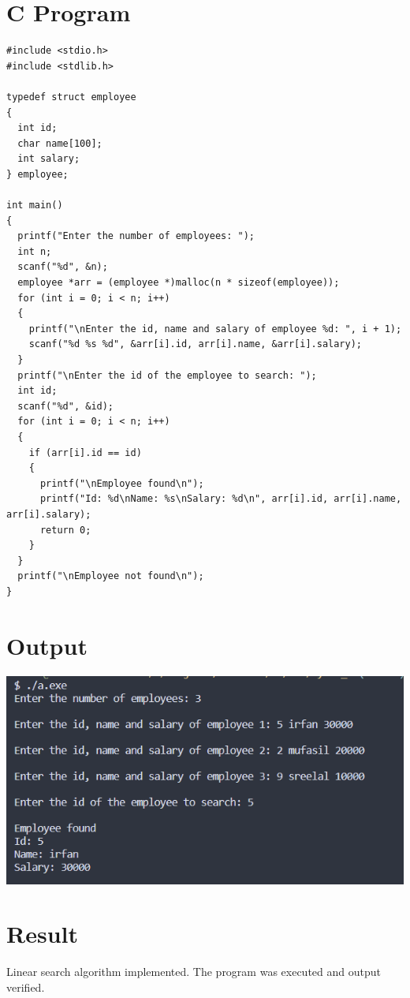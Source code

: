 \section{C Program}
\begin{lstlisting}[label={list:c_program:employee_search}]
#include <stdio.h>
#include <stdlib.h>

typedef struct employee
{
  int id;
  char name[100];
  int salary;
} employee;

int main()
{
  printf("Enter the number of employees: ");
  int n;
  scanf("%d", &n);
  employee *arr = (employee *)malloc(n * sizeof(employee));
  for (int i = 0; i < n; i++)
  {
    printf("\nEnter the id, name and salary of employee %d: ", i + 1);
    scanf("%d %s %d", &arr[i].id, arr[i].name, &arr[i].salary);
  }
  printf("\nEnter the id of the employee to search: ");
  int id;
  scanf("%d", &id);
  for (int i = 0; i < n; i++)
  {
    if (arr[i].id == id)
    {
      printf("\nEmployee found\n");
      printf("Id: %d\nName: %s\nSalary: %d\n", arr[i].id, arr[i].name, arr[i].salary);
      return 0;
    }
  }
  printf("\nEmployee not found\n");
}
\end{lstlisting}

\section{Output}
\includegraphics[]{Cycle_1/Outputs/LinearSearch.png}

\section{Result}
Linear search algorithm implemented. The program was executed and output verified.
